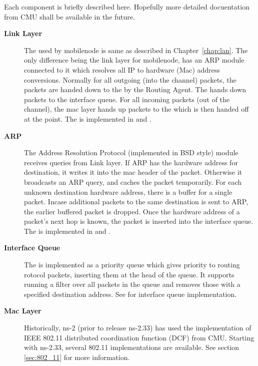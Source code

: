 Each component is briefly described here. Hopefully more detailed
docuentation from CMU shall be available in the future. 
\begin{description}
\item[{\bf Link Layer}] The  used by mobilenode is same as
  described in Chapter~\ref{chap:lan}. The only difference being the
  link layer for mobilenode, has an ARP module connected to it which
  resolves all IP to hardware (Mac) address conversions. Normally for
  all outgoing (into the channel) packets, the packets are handed down
  to the  by the Routing Agent. The  hands down
  packets to the interface queue. For all incoming packets (out of the
  channel), the mac layer hands up packets to the  which is
  then handed off at the  point. The
   is implemented in  and
  .

\item [{\bf ARP}] The Address Resolution Protocol (implemented in BSD
  style) module receives queries from Link layer. If ARP has the
  hardware address for destination, it writes it into the mac header
  of the packet. Otherwise it broadcasts an ARP query, and caches the
  packet temporarily. For each unknown destination hardware address,
  there is a buffer for a single packet. Incase additional packets to
  the same destination is sent to ARP, the earlier buffered packet is
  dropped. Once the hardware address of a
  packet's next hop is known, the packet is inserted into the
  interface queue. The  is implemented
  in  and .

\item[{\bf Interface Queue}] The 
  is implemented as a priority queue which gives priority to routing  
  rotocol packets, inserting them at the head of the queue. It supports
  running a filter over all packets in the queue and removes those with
  a specified destination address. See  for 
  interface queue implementation.

\item[{\bf Mac Layer}] Historically, ns-2 (prior to release ns-2.33)
  has used the implementation of IEEE 802.11 distributed coordination 
  function (DCF) from CMU. Starting with ns-2.33, several 802.11 
  implementations are available.  See section \ref{sec:802_11} for
  more information.


\end{description}

